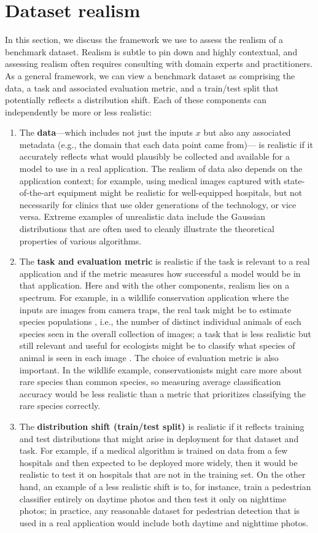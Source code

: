 \section{Dataset realism}\label{sec:app_realism}
In this section, we discuss the framework we use to assess the realism of a benchmark dataset.
Realism is subtle to pin down and highly contextual, and assessing realism often requires consulting with domain experts and practitioners. As a general framework, we can view a benchmark dataset as comprising the data, a task and associated evaluation metric, and a train/test split that potentially reflects a distribution shift.
Each of these components can independently be more or less realistic:
\begin{enumerate}
  \item The \textbf{data}---which includes not just the inputs $x$ but also any associated metadata (e.g., the domain that each data point came from)--- is realistic if it accurately reflects what would plausibly be collected and available for a model to use in a real application.
  The realism of data also depends on the application context; for example, using medical images captured with state-of-the-art equipment might be realistic for well-equipped hospitals, but not necessarily for clinics that use older generations of the technology, or vice versa.
  Extreme examples of unrealistic data include the Gaussian distributions that are often used to cleanly illustrate the theoretical properties of various algorithms.
  \item The \textbf{task and evaluation metric} is realistic if the task is relevant to a real application and if the metric measures how successful a model would be in that application.
  Here and with the other components, realism lies on a spectrum.
  For example, in a wildlife conservation application where the inputs are images from camera traps, the real task might be to estimate species populations \citep{parham2017animal}, i.e., the number of distinct individual animals of each species seen in the overall collection of images; a task that is less realistic but still relevant and useful for ecologists might be to classify what species of animal is seen in each image \citep{tabak2019machine}.
  The choice of evaluation metric is also important. In the wildlife example, conservationists might care more about rare species than common species, so measuring average classification accuracy would be less realistic than a metric that prioritizes classifying the rare species correctly.
  \item The \textbf{distribution shift (train/test split)} is realistic if it reflects training and test distributions that might arise in deployment for that dataset and task.
  For example, if a medical algorithm is trained on data from a few hospitals and then expected to be deployed more widely, then it would be realistic to test it on hospitals that are not in the training set.
  On the other hand, an example of a less realistic shift is to, for instance, train a pedestrian classifier entirely on daytime photos and then test it only on nighttime photos;
  in practice, any reasonable dataset for pedestrian detection that is used in a real application would include both daytime and nighttime photos.
\end{enumerate}
